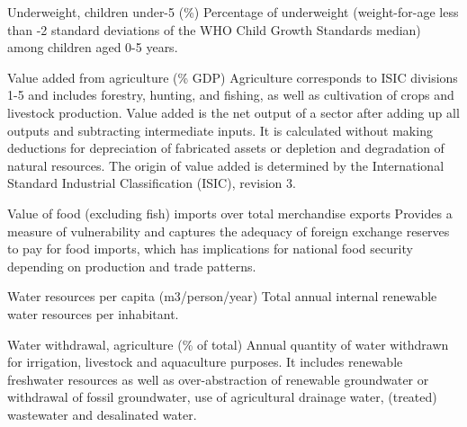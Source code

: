 \begin{MetadataCollection} {}
\begin{metadata}{Underweight, children under-5 (\%)} {}
Percentage of underweight (weight-for-age less than -2 standard deviations of the WHO Child Growth Standards median) among children aged 0-5 years.
\end{metadata}

\begin{metadata}{Value added from agriculture (\% GDP)} {}
Agriculture corresponds to ISIC divisions 1-5 and includes forestry, hunting, and fishing, as well as cultivation of crops and livestock production. Value added is the net output of a sector after adding up all outputs and subtracting intermediate inputs. It is calculated without making deductions for depreciation of fabricated assets or depletion and degradation of natural resources. The origin of value added is determined by the International Standard Industrial Classification (ISIC), revision 3.
\end{metadata}

\begin{metadata}{Value of food (excluding fish) imports over total merchandise exports} {}
Provides a measure of vulnerability and captures the adequacy of foreign exchange reserves to pay for food imports, which has implications for national food security depending on production and trade patterns.
\end{metadata}

\begin{metadata}{Water resources per capita (m3/person/year)} {}
Total annual internal renewable water resources per inhabitant.
\end{metadata}

\begin{metadata}{Water withdrawal, agriculture (\% of total)} {}
Annual quantity of water withdrawn for irrigation, livestock and aquaculture purposes. It includes renewable freshwater resources as well as over-abstraction of renewable groundwater or withdrawal of fossil groundwater, use of agricultural drainage water, (treated) wastewater and desalinated water.
\end{metadata}


\end{MetadataCollection}
